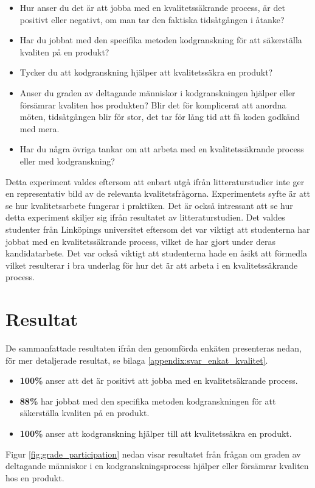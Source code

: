 \begin{itemize}
	\item Hur anser du det är att jobba med en kvalitetssäkrande process, är det positivt eller negativt, om man tar den faktiska tidsåtgången i åtanke?
	\item Har du jobbat med den specifika metoden kodgranskning för att säkerställa kvaliten på en produkt?
	\item Tycker du att kodgranskning hjälper att kvalitetssäkra en produkt?
	\item Anser du graden av deltagande människor i kodgranskningen hjälper eller försämrar kvaliten hos produkten? Blir det för komplicerat att anordna möten, tidsåtgången blir för stor, det tar för lång tid att få koden godkänd med mera.
	\item Har du några övriga tankar om att arbeta med en kvalitetssäkrande process eller med kodgranskning?
\end{itemize}

Detta experiment valdes eftersom att enbart utgå ifrån litteraturstudier inte ger en representativ bild av de relevanta kvalitetsfrågorna. Experimentets syfte är att se hur kvalitetsarbete fungerar i praktiken. Det är också intressant att se hur detta experiment skiljer sig ifrån resultatet av litteraturstudien. Det valdes studenter från Linköpings universitet eftersom det var viktigt att studenterna har jobbat med en kvalitetssäkrande process, vilket de har gjort under deras kandidatarbete. Det var också viktigt att studenterna hade en åsikt att förmedla vilket resulterar i bra underlag för hur det är att arbeta i en kvalitetssäkrande process. 

\section{Resultat}
\label{sec:results-wallstrom}

De sammanfattade resultaten ifrån den genomförda enkäten presenteras nedan, för mer detaljerade resultat, se bilaga \ref{appendix:svar_enkat_kvalitet}.
\begin{itemize}
	\item \textbf{100\%} anser att det är positivt att jobba med en kvalitetsäkrande process.
	\item \textbf{88\%} har jobbat med den specifika metoden kodgranskningen för att säkerställa kvaliten på en produkt.
	\item \textbf{100\%} anser att kodgranskning hjälper till att kvalitetssäkra en produkt.
\end{itemize}
Figur \ref{fig:grade_participation} nedan visar resultatet från frågan om graden av deltagande människor i en kodgranskningsprocess hjälper eller försämrar kvaliten hos en produkt.

